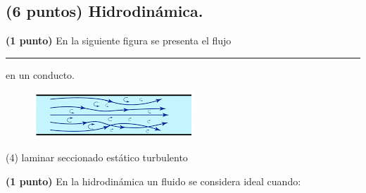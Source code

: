 \documentclass[12pt, letter]{exam}
\begin{document}


\newpage

\begin{questions}
    
    \section{(6 puntos) Hidrodinámica.}

    \question \textbf{(1 punto)} En la siguiente figura se presenta el flujo \rule{2cm}{0.1mm} en un conducto.
    \begin{figure}[H]
        \centering
        \includegraphics[scale=0.8]{Flujo_01_Turbulento.png}
    \end{figure}
    \begin{tasks}(4)
        \task laminar
        \task seccionado
        \task estático
        \task turbulento
    \end{tasks}
    \question \textbf{(1 punto)} En la hidrodinámica un fluido se considera ideal cuando:
\end{questions}
\end{document}
